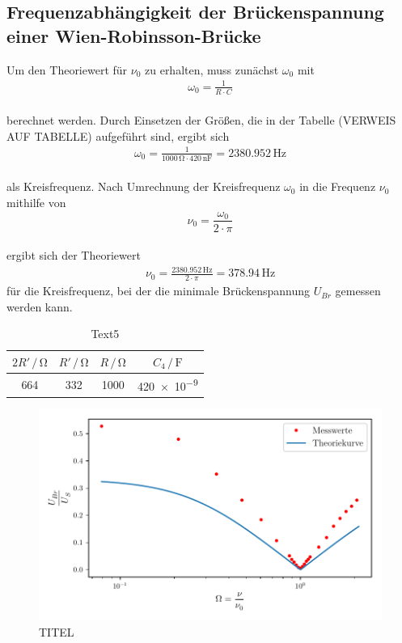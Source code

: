 \subsection{Frequenzabhängigkeit der Brückenspannung einer Wien-Robinsson-Brücke}



Um den Theoriewert für $\nu_{0}$ zu erhalten, muss zunächst $\omega_{0}$ mit 
\begin{align}
\omega_{0} = \frac{1}{R \cdot C} \nonumber
\end{align}
\\ 
berechnet werden. Durch Einsetzen der Größen, die in der Tabelle (VERWEIS AUF TABELLE) 
aufgeführt sind, ergibt sich
\begin{align}
\omega_{0} = \frac{1}{1000\, \si{\ohm} \cdot 420\, \si{\nano\farad}} = 2380.952\, \si{\hertz}
\end{align}
\\ 
als Kreisfrequenz. Nach Umrechnung der Kreisfrequenz $\omega_{0}$ in die Frequenz $\nu_{0}$ mithilfe von 
\begin{equation}
\nu_{0} = \frac{\omega_{0}}{2 \cdot \pi}
\end{equation}
\\
ergibt sich der Theoriewert 
\begin{align}
\nu_{0} = \frac{2380.952\, \si{\hertz}}{2 \cdot \pi} = 378.94\, \si{\hertz}
\end{align}
für die Kreisfrequenz, bei der die minimale Brückenspannung $U_{Br}$ gemessen werden kann.




\begin{table}
\normalsize
\centering
{}
\begin{tabular}{c c c c}
\toprule
        $2R' \,/\,\si{\ohm}$ & $R' \,/\,\si{\ohm}$ & $R \,/\,\si{\ohm}$ & $C_{4} \,/\, \si{\farad}$ \\
        \midrule
        664 & 332 & 1000 & \num{420e-9} \\
\bottomrule
\end{tabular}
\caption{Text5} 
\label{tab:6}
\end{table}


\noindent
\begin{figure}
  \centering
  \includegraphics{plot.pdf}
   \caption{TITEL}
   \label{fig:plot}
\end{figure}


